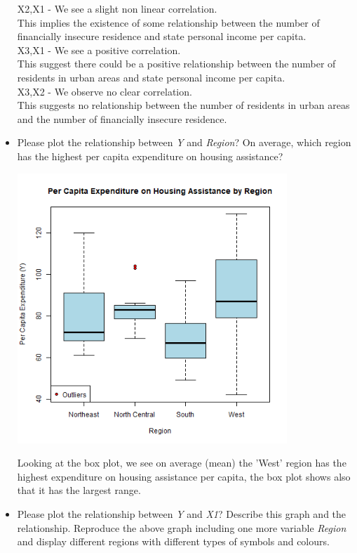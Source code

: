 \documentclass[12pt,letterpaper]{article}
\begin{document}
\begin{itemize}
X2,X1 - We see a slight non linear correlation.\\
		This implies the existence of some relationship between the number of financially insecure residence and state personal income per capita.\\

X3,X1 - We see a positive correlation.\\
		This suggest there could be a positive relationship between the number of residents in urban areas and state personal income per capita.\\
		
		 
X3,X2 - We observe no clear correlation.\\
		This suggests no relationship between the number of residents in urban areas and the number of financially insecure residence.\\



\newpage
\item
Please plot the relationship between \emph{Y} and \emph{Region}? On average, which region has the highest per capita expenditure on housing assistance?
\vspace{.5cm}

\includegraphics[width=0.8\textwidth]{images/Y_against_Region.png}

Looking at the box plot, we see on average (mean) the 'West' region has the highest expenditure on housing assistance per capita, the box plot shows also that it has the largest range.

\newpage
\item
Please plot the relationship between \emph{Y} and \emph{X1}? Describe this graph and the relationship. Reproduce the above graph including one more variable \emph{Region} and display different regions with different types of symbols and colours.


\end{itemize}
\end{document}
